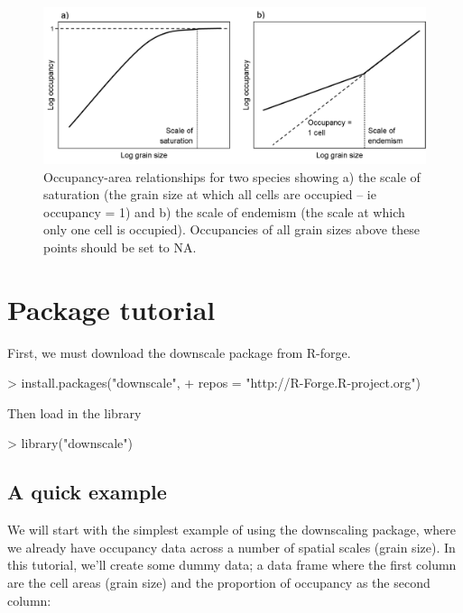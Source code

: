 \documentclass{article}[12pt, a4paper]
\begin{document}
\begin{figure}[!t]
\centering
\includegraphics[width=\linewidth]{Saturation.png}
\caption{Occupancy-area relationships for two species showing a) the scale of saturation (the grain size at which all cells are occupied – ie occupancy = 1) and b) the scale of endemism (the scale at which only one cell is occupied). Occupancies of all grain sizes above these points should be set to NA.}
\label{fig:Saturation}
\end{figure}

\section{Package tutorial}

First, we must download the downscale package from R-forge.

\begin{Schunk}
\begin{Sinput}
> install.packages("downscale",
+                  repos = "http://R-Forge.R-project.org")
\end{Sinput}
\end{Schunk}

Then load in the library

\begin{Schunk}
\begin{Sinput}
> library("downscale")
\end{Sinput}
\end{Schunk}

\subsection{A quick example}
We will start with the simplest example of using the downscaling package, where we already have occupancy data across a number of spatial scales (grain size). In this tutorial, we’ll create some dummy data; a data frame where the first column are the cell areas (grain size) and the proportion of occupancy as the second column:
\end{document}
